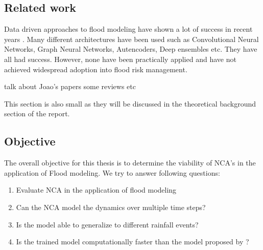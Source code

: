 \subsection{Related work}
Data driven approaches to flood modeling have shown a lot of success in recent years \cite{russo2023evaluation, karim2023review, chaudhary2022flood}. Many different architectures have been used such as Convolutional Neural Networks, Graph Neural Networks, Autencoders, Deep ensembles etc. They have all had success. However, none have been practically applied and have not achieved widespread adoption into flood risk management. 

talk about Joao's papers
some reviews etc

This section is also small as they will be discussed in the theoretical background section of the report.

\subsection{Objective}
The overall objective for this thesis is to determine the viability of NCA's in the application of Flood modeling. We try to answer following questions:

\begin{enumerate}
	\item Evaluate NCA in the application of flood modeling 
	\item Can the NCA model the dynamics over multiple time steps?
	\item Is the model able to generalize to different rainfall events?
	\item Is the trained model computationally faster than the model proposed by \cite{guidolin2016weighted}?
\end{enumerate}